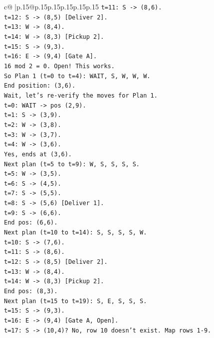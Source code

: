 \documentclass{article}
\begin{document}
{\begin{supertabular}{c@{$\;$}|p{.15\linewidth}@{}p{.15\linewidth}p{.15\linewidth}p{.15\linewidth}p{.15\linewidth}p{.15\linewidth}}
{{{\texttt{t=11: S {-}> (8,6).} \\
\texttt{t=12: S {-}> (8,5) {[}Deliver 2{]}.} \\
\texttt{t=13: W {-}> (8,4).} \\
\texttt{t=14: W {-}> (8,3) {[}Pickup 2{]}.} \\
\texttt{t=15: S {-}> (9,3).} \\
\texttt{t=16: E {-}> (9,4) {[}Gate A{]}.} \\
\texttt{16 mod 2 = 0. Open! This works.} \\
\texttt{So Plan 1 (t=0 to t=4): WAIT, S, W, W, W.} \\
\texttt{End position: (3,6).} \\
\texttt{Wait, let's re{-}verify the moves for Plan 1.} \\
\texttt{t=0: WAIT {-}> pos (2,9).} \\
\texttt{t=1: S {-}> (3,9).} \\
\texttt{t=2: W {-}> (3,8).} \\
\texttt{t=3: W {-}> (3,7).} \\
\texttt{t=4: W {-}> (3,6).} \\
\texttt{Yes, ends at (3,6).} \\
\texttt{Next plan (t=5 to t=9): W, S, S, S, S.} \\
\texttt{t=5: W {-}> (3,5).} \\
\texttt{t=6: S {-}> (4,5).} \\
\texttt{t=7: S {-}> (5,5).} \\
\texttt{t=8: S {-}> (5,6) {[}Deliver 1{]}.} \\
\texttt{t=9: S {-}> (6,6).} \\
\texttt{End pos: (6,6).} \\
\texttt{Next plan (t=10 to t=14): S, S, S, S, W.} \\
\texttt{t=10: S {-}> (7,6).} \\
\texttt{t=11: S {-}> (8,6).} \\
\texttt{t=12: S {-}> (8,5) {[}Deliver 2{]}.} \\
\texttt{t=13: W {-}> (8,4).} \\
\texttt{t=14: W {-}> (8,3) {[}Pickup 2{]}.} \\
\texttt{End pos: (8,3).} \\
\texttt{Next plan (t=15 to t=19): S, E, S, S, S.} \\
\texttt{t=15: S {-}> (9,3).} \\
\texttt{t=16: E {-}> (9,4) {[}Gate A, Open{]}.} \\
\texttt{t=17: S {-}> (10,4)? No, row 10 doesn't exist. Map rows 1{-}9.} \\
}}}
\end{supertabular}}
\end{document}
